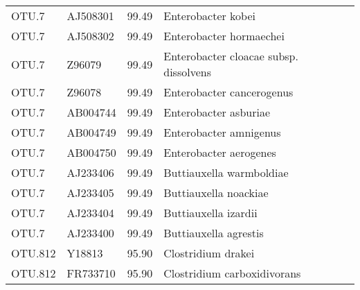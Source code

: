 \begin{tabular}{llrl}
  OTU.7 & AJ508301 & 99.49 & Enterobacter kobei \\ 
  OTU.7 & AJ508302 & 99.49 & Enterobacter hormaechei \\ 
  OTU.7 & Z96079 & 99.49 & Enterobacter cloacae subsp. dissolvens \\ 
  OTU.7 & Z96078 & 99.49 & Enterobacter cancerogenus \\ 
  OTU.7 & AB004744 & 99.49 & Enterobacter asburiae \\ 
  OTU.7 & AB004749 & 99.49 & Enterobacter amnigenus \\ 
  OTU.7 & AB004750 & 99.49 & Enterobacter aerogenes \\ 
  OTU.7 & AJ233406 & 99.49 & Buttiauxella warmboldiae \\ 
  OTU.7 & AJ233405 & 99.49 & Buttiauxella noackiae \\ 
  OTU.7 & AJ233404 & 99.49 & Buttiauxella izardii \\ 
  OTU.7 & AJ233400 & 99.49 & Buttiauxella agrestis \\ 
  OTU.812 & Y18813 & 95.90 & Clostridium drakei \\ 
  OTU.812 & FR733710 & 95.90 & Clostridium carboxidivorans \\ 
   \hline
\end{tabular}